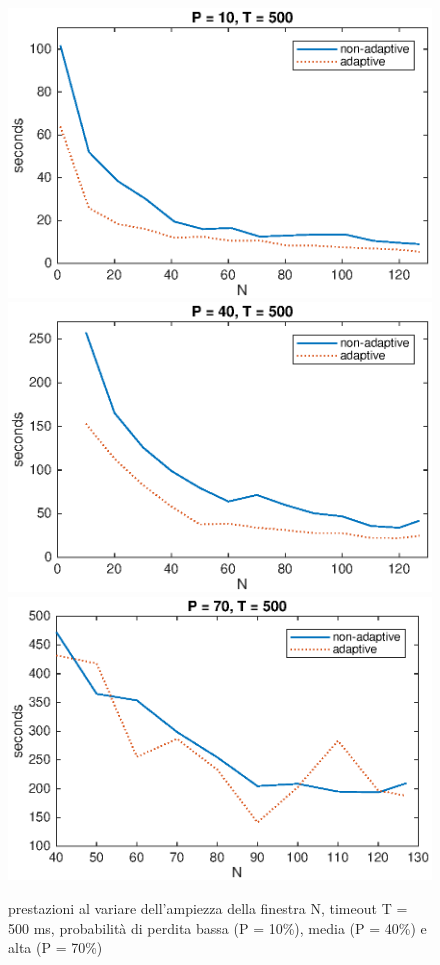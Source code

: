 \begin{figure}[!hp]
	\includegraphics[scale=0.5]{images/N_T500_P10}
	\includegraphics[scale=0.5]{images/N_T500_P40}
	\includegraphics[scale=0.5]{images/N_T500_P70}
	\caption{prestazioni al variare dell'ampiezza della finestra N,
			 timeout T = 500 ms, probabilità di perdita bassa (P = 10\%),
			 media (P = 40\%) e alta (P = 70\%)}
\end{figure}
